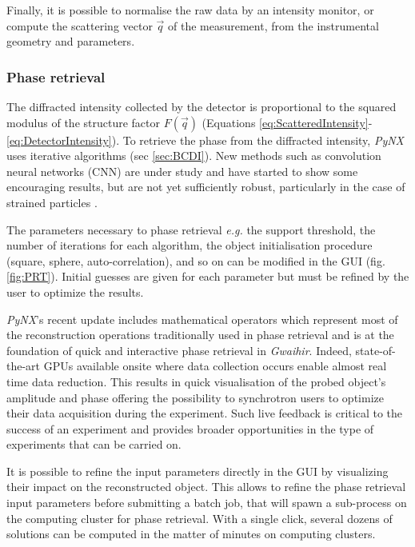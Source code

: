 Finally, it is possible to normalise the raw data by an intensity monitor, or compute the scattering vector $\vec{q}$ of the measurement, from the instrumental geometry and parameters.

\subsubsection{Phase retrieval}

The diffracted intensity collected by the detector is proportional to the squared modulus of the structure factor $F(\vec{q})$ (Equations \ref{eq:ScatteredIntensity}-\ref{eq:DetectorIntensity}).
To retrieve the phase from the diffracted intensity, \textit{PyNX} uses iterative algorithms (sec \ref{sec:BCDI}).
New methods such as convolution neural networks (CNN) are under study and have started to show some encouraging results, but are not yet sufficiently robust, particularly in the case of strained particles \parencite{cherukara_real-time_2018,chan_rapid_2021,Wu2021a}.

The parameters necessary to phase retrieval \parencite{fienup_phase_1982,fienup_reconstruction_1978,Marchesini2007,pynx2020operators} \textit{e.g.} the support threshold, the number of iterations for each algorithm, the object initialisation procedure (square, sphere, auto-correlation), and so on can be modified in the GUI (fig. \ref{fig:PRT}).
Initial guesses are given for each parameter but must be refined by the user to optimize the results.

\textit{PyNX}'s recent update includes mathematical operators \parencite{pynx2020operators} which represent most of the reconstruction operations traditionally used in phase retrieval \parencite{gerchberg_practical_1972,fienup_reconstruction_1978,Marchesini2007} and is at the foundation of quick and interactive phase retrieval in \textit{Gwaihir}.
Indeed, state-of-the-art GPUs available onsite where data collection occurs enable almost real time data reduction.
This results in quick visualisation of the probed object's amplitude and phase offering the possibility to synchrotron users to optimize their data acquisition during the experiment.
Such live feedback is critical to the success of an experiment and provides broader opportunities in the type of experiments that can be carried on.

It is possible to refine the input parameters directly in the GUI by visualizing their impact on the reconstructed object.
This allows to refine the phase retrieval input parameters before submitting a batch job, that will spawn a sub-process on the computing cluster for phase retrieval.
With a single click, several dozens of solutions can be computed in the matter of minutes on computing clusters.

